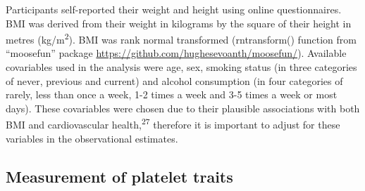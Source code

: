 \documentclass[11pt,twoside]{bristolthesis}
\begin{document}
Participants self-reported their weight and height using online questionnaires. BMI was derived from their weight in kilograms by the square of their height in metres (kg/m\textsuperscript{2}). BMI was rank normal transformed (rntransform() function from ``moosefun'' package \url{https://github.com/hughesevoanth/moosefun/}). Available covariables used in the analysis were age, sex, smoking status (in three categories of never, previous and current) and alcohol consumption (in four categories of rarely, less than once a week, 1-2 times a week and 3-5 times a week or most days). These covariables were chosen due to their plausible associations with both BMI and cardiovascular health,\textsuperscript{27} therefore it is important to adjust for these variables in the observational estimates.

\hypertarget{measurement-of-platelet-traits}{%
\subsection{Measurement of platelet traits}\label{measurement-of-platelet-traits}}
\end{document}
